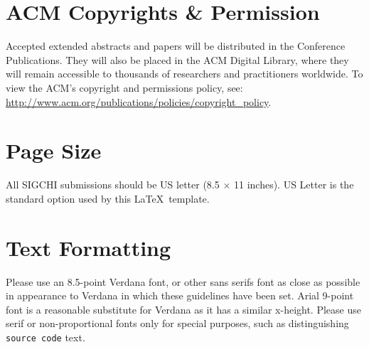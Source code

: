 \documentclass{sigchi-ext}
\begin{document}
    \section{ACM Copyrights \& Permission}
    Accepted extended abstracts and papers will be distributed in the
    Conference Publications. They will also be placed in the ACM Digital
    Library, where they will remain accessible to thousands of researchers
    and practitioners worldwide. To view the ACM's copyright and
    permissions policy, see:
    \url{http://www.acm.org/publications/policies/copyright_policy}.
    
    
    \section{Page Size}
    All SIGCHI submissions should be US letter (8.5 $\times$ 11
    inches). US Letter is the standard option used by this \LaTeX\
    template.
    
    \section{Text Formatting}
    Please use an 8.5-point Verdana font, or other sans serifs font as
    close as possible in appearance to Verdana in which these guidelines
    have been set. Arial 9-point font is a reasonable substitute for
    Verdana as it has a similar x-height. Please use serif or
    non-proportional fonts only for special purposes, such as
    distinguishing \texttt{source code} text.
    
\end{document}
